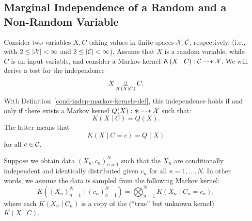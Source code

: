 \subsection{Marginal Independence of a Random and a Non-Random Variable}

Consider two variables $X,C$ taking values in finite spaces $\mathcal{X},\mathcal{C}$, respectively,
(i.e., with $2\le|\mathcal{X}|<\infty$ and $2\le|\mathcal{C}|<\infty$).
Assume that $X$ is a random variable, while $C$ is an input variable, 
and consider a Markov kernel $K(X\mid C) : \mathcal{C} \dashrightarrow \mathcal{X}$. 
We will derive a test for the independence $$X \operatorname*{\perp\mkern-11mu\perp}_{K(X\mid C)} C.$$
With Definition~\ref{cond-indep-markov-kernels-def}, this independence holds
if and only if there exists a Markov kernel $Q(X) : \Asterisk \dshto \C{X}$ such that:
\[ K(X\mid C) = Q(X).\]
The latter means that
\begin{equation}\label{eq:indep_test_CX}
  K(X \mid C=c) = Q(X)
\end{equation}
for all $c \in \mathcal{C}$.

Suppose we obtain data $(X_n,c_n)_{n=1}^N$ such that the
$X_n$ are conditionally independent and identically distributed given $c_n$ for all $n=1,\dots,N$.
In other words, we assume the data is sampled from the following Markov kernel:
$$K((X_n)_{n=1}^N \mid (c_n)_{n=1}^N) = \bigotimes_{n=1}^N K(X_n \mid C_n=c_n),$$
where each $K(X_n \mid C_n)$ is a copy of the (``true'' but unknown kernel) $K(X \mid C)$.

